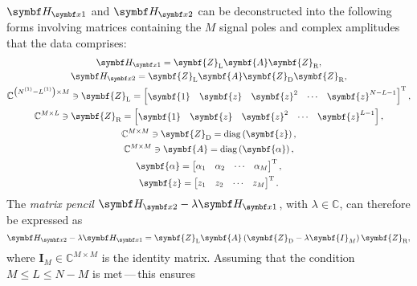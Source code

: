 $\Hxone$ and  $\Hxtwo$ can be deconstructed into the following forms involving
matrices containing the $M$ signal poles and complex amplitudes that the data
comprises:
\begin{subequations}
   \begin{gather}
       \Hxone = \symbf{Z}_{\text{L}} \symbf{A} \symbf{Z}_{\text{R}},\\
       \Hxtwo = \symbf{Z}_{\text{L}} \symbf{A} \symbf{Z}_{\text{D}} \symbf{Z}_{\text{R}},\\
       \mathbb{C}^{\left(\None - \Lone\right) \times M} \ni
       \symbf{Z}_{\text{L}} =
       \begin{bmatrix}
           \symbf{1} &
           \symbf{z} &
           \symbf{z}^2 &
           \cdots &
           \symbf{z}^{N-L-1}
        \end{bmatrix}\T,\\
        \mathbb{C}^{M \times L} \ni
        \symbf{Z}_{\text{R}} =
           \begin{bmatrix}
               \symbf{1} & \symbf{z} & {\symbf{z}}^{2} & \cdots & {\symbf{z}}^{L-1}
           \end{bmatrix} ,\\
        \mathbb{C}^{M \times M} \ni
        \symbf{Z}_{\text{D}} = \diag\left(\symbf{z}\right), \label{eq:ZD}\\
        \mathbb{C}^{M \times M} \ni
        \symbf{A} = \diag\left(\symbf{\alpha}\right),\label{eq:A}\\
        \symbf{\alpha} =
        \begin{bmatrix}
            \alpha_1 & \alpha_2 & \cdots & \alpha_M
        \end{bmatrix}\T,\\
        \symbf{z} =
        \begin{bmatrix}
            z_1 & z_2 & \cdots & z_M
        \end{bmatrix}\T.
   \end{gather}%
    \label{eq:HX-decomp}%
\end{subequations}%
The \emph{matrix pencil} $\Hxtwo - \lambda\Hxone$, with $\lambda \in
\mathbb{C}$, can therefore be expressed as
\begin{equation}
    \Hxtwo - \lambda \Hxone = \symbf{Z}_{\text{L}} \symbf{A} \left(
        \symbf{Z}_{\text{D}} - \lambda \symbf{I}_M
    \right) \symbf{Z}_{\text{R}},
\end{equation}
where $\symbf{I}_M \in \mathbb{C}^{M \times M}$ is the identity matrix.
Assuming that the condition $M \leq L \leq N - M$ is met\,---\,this ensures
